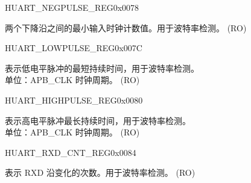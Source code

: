 \begin{register}{H}{UART\_NEGPULSE\_REG}{0x0078}\label{regdesc:UARTNEGPULSEREG}
%
%
\regnewline%
\begin{regdesc}\begin{reglist}
\label{fielddesc:UARTNEGEDGEMINCNT}\item [UART\_NEGEDGE\_MIN\_CNT] 两个下降沿之间的最小输入时钟计数值。用于波特率检测。 (RO)
\end{reglist}\end{regdesc}
\end{register}


\begin{register}{H}{UART\_LOWPULSE\_REG}{0x007C}\label{regdesc:UARTLOWPULSEREG}
%
%
\regnewline%
\begin{regdesc}\begin{reglist}
\label{fielddesc:UARTLOWPULSEMINCNT}\item [UART\_LOWPULSE\_MIN\_CNT] 表示低电平脉冲的最短持续时间，用于波特率检测。\\单位：APB\_CLK 时钟周期。 (RO)
\end{reglist}\end{regdesc}
\end{register}


\begin{register}{H}{UART\_HIGHPULSE\_REG}{0x0080}\label{regdesc:UARTHIGHPULSEREG}
%
%
\regnewline%
\begin{regdesc}\begin{reglist}
\label{fielddesc:UARTHIGHPULSEMINCNT}\item [UART\_HIGHPULSE\_MIN\_CNT] 表示高电平脉冲最长持续时间，用于波特率检测。\\单位：APB\_CLK 时钟周期。 (RO)
\end{reglist}\end{regdesc}
\end{register}


\begin{register}{H}{UART\_RXD\_CNT\_REG}{0x0084}\label{regdesc:UARTRXDCNTREG}
%
%
\regnewline%
\begin{regdesc}\begin{reglist}
\label{fielddesc:UARTRXDEDGECNT}\item [UART\_RXD\_EDGE\_CNT] 表示 RXD 沿变化的次数。用于波特率检测。 (RO)
\end{reglist}\end{regdesc}
\end{register}



